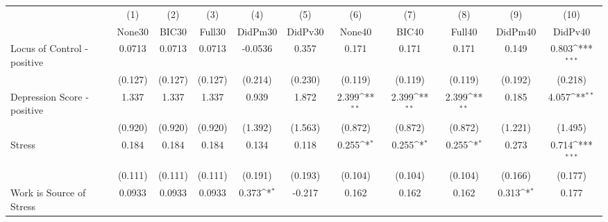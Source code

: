 {
\def\sym#1{\ifmmode^{#1}\else\(^{#1}\)\fi}
\begin{tabular}{l*{10}{c}}
\toprule
            &\multicolumn{1}{c}{(1)}&\multicolumn{1}{c}{(2)}&\multicolumn{1}{c}{(3)}&\multicolumn{1}{c}{(4)}&\multicolumn{1}{c}{(5)}&\multicolumn{1}{c}{(6)}&\multicolumn{1}{c}{(7)}&\multicolumn{1}{c}{(8)}&\multicolumn{1}{c}{(9)}&\multicolumn{1}{c}{(10)}\\
            &\multicolumn{1}{c}{None30}&\multicolumn{1}{c}{BIC30}&\multicolumn{1}{c}{Full30}&\multicolumn{1}{c}{DidPm30}&\multicolumn{1}{c}{DidPv30}&\multicolumn{1}{c}{None40}&\multicolumn{1}{c}{BIC40}&\multicolumn{1}{c}{Full40}&\multicolumn{1}{c}{DidPm40}&\multicolumn{1}{c}{DidPv40}\\
\midrule
Locus of Control - positive&      0.0713         &      0.0713         &      0.0713         &     -0.0536         &       0.357         &       0.171         &       0.171         &       0.171         &       0.149         &       0.803\sym{***}\\
            &     (0.127)         &     (0.127)         &     (0.127)         &     (0.214)         &     (0.230)         &     (0.119)         &     (0.119)         &     (0.119)         &     (0.192)         &     (0.218)         \\
\addlinespace
Depression Score - positive&       1.337         &       1.337         &       1.337         &       0.939         &       1.872         &       2.399\sym{**} &       2.399\sym{**} &       2.399\sym{**} &       0.185         &       4.057\sym{**} \\
            &     (0.920)         &     (0.920)         &     (0.920)         &     (1.392)         &     (1.563)         &     (0.872)         &     (0.872)         &     (0.872)         &     (1.221)         &     (1.495)         \\
\addlinespace
Stress      &       0.184         &       0.184         &       0.184         &       0.134         &       0.118         &       0.255\sym{*}  &       0.255\sym{*}  &       0.255\sym{*}  &       0.273         &       0.714\sym{***}\\
            &     (0.111)         &     (0.111)         &     (0.111)         &     (0.191)         &     (0.193)         &     (0.104)         &     (0.104)         &     (0.104)         &     (0.166)         &     (0.177)         \\
\addlinespace
Work is Source of Stress&      0.0933         &      0.0933         &      0.0933         &       0.373\sym{*}  &      -0.217         &       0.162         &       0.162         &       0.162         &       0.313\sym{*}  &       0.177         \\

\end{tabular}}
